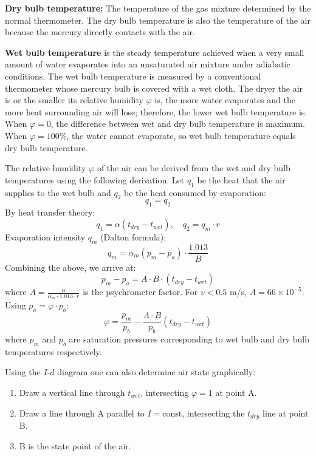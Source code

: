 \textbf{Dry bulb temperature:} The temperature of the gas mixture determined by the normal thermometer. The dry bulb temperature is also the temperature of the air because the mercury directly contacts with the air.

\textbf{Wet bulb temperature} is the steady temperature achieved when a very small amount of water evaporates into an unsaturated air mixture under adiabatic conditions. The wet bulb temperature is measured by a conventional thermometer whose mercury bulb is covered with a wet cloth. The dryer the air is or the smaller its relative humidity $\varphi$ is, the more water evaporates and the more heat surrounding air will lose; therefore, the lower wet bulb temperature is. When $\varphi = 0$, the difference between wet and dry bulb temperature is maximum. When $\varphi = 100\%$, the water cannot evaporate, so wet bulb temperature equals dry bulb temperature.

\vspace{0.3cm}
\noindent The relative humidity $\varphi$ of the air can be derived from the wet and dry bulb temperatures using the following derivation. Let $q_1$ be the heat that the air supplies to the wet bulb and $q_2$ be the heat consumed by evaporation:
\begin{equation*}
    q_1 = q_2
\end{equation*}
By heat transfer theory:
\begin{equation*}
    q_1 = \alpha (t_{dry} - t_{wet}), \quad q_2 = q_m \cdot r
\end{equation*}
Evaporation intensity $q_m$ (Dalton formula):
\begin{equation*}
    q_m = \alpha_m (p_m - p_a) \cdot \frac{1.013}{B}
\end{equation*}
Combining the above, we arrive at:
\begin{equation*}
    p_m - p_a = A \cdot B \cdot (t_{dry} - t_{wet})
\end{equation*}
where $A = \frac{\alpha}{\alpha_m \cdot 1.013 \cdot r}$ is the psychrometer factor. For $v < 0.5$ m/s, $A = 66 \times 10^{-5}$. Using $p_a = \varphi \cdot p_b$:
\begin{equation*}
    \varphi = \frac{p_m}{p_b} - \frac{A \cdot B}{p_b}(t_{dry} - t_{wet}) \tag{6}
\end{equation*}
where $p_m$ and $p_b$ are saturation pressures corresponding to wet bulb and dry bulb temperatures respectively.

Using the $I$-$d$ diagram one can also determine air state graphically:
\begin{enumerate}
    \item Draw a vertical line through $t_{wet}$, intersecting $\varphi = 1$ at point A.
    \item Draw a line through A parallel to $I = \text{const}$, intersecting the $t_{dry}$ line at point B.
    \item B is the state point of the air.
\end{enumerate}

